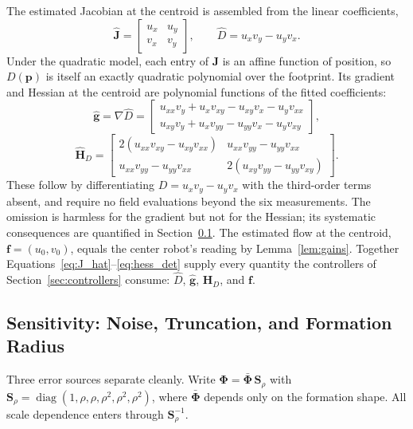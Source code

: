 \documentclass[12pt, letterpaper, oneside]{report}
\begin{document}
The estimated Jacobian at the centroid is assembled from the linear
coefficients,
\begin{equation}
\hat{\mathbf{J}} = \begin{bmatrix} u_x & u_y \\ v_x & v_y \end{bmatrix}, \qquad
\hat D = u_xv_y - u_yv_x.
\label{eq:J_hat}
\end{equation}
Under the quadratic model, each entry of $\mathbf{J}$ is an affine function
of position, so $D(\mathbf{p})$ is itself an exactly quadratic polynomial
over the footprint. Its gradient and Hessian at the centroid are
polynomial functions of the fitted coefficients:
\begin{equation}
\hat{\mathbf{g}} = \nabla\hat D = \begin{bmatrix} u_{xx}v_y + u_xv_{xy} - u_{xy}v_x - u_yv_{xx} \\ u_{xy}v_y + u_xv_{yy} - u_{yy}v_x - u_yv_{xy} \end{bmatrix},
\label{eq:grad_det}
\end{equation}
\begin{equation}
\hat{\mathbf{H}}_D = \begin{bmatrix}
2(u_{xx}v_{xy}-u_{xy}v_{xx}) & u_{xx}v_{yy}-u_{yy}v_{xx} \\
u_{xx}v_{yy}-u_{yy}v_{xx} & 2(u_{xy}v_{yy}-u_{yy}v_{xy})
\end{bmatrix}.
\label{eq:hess_det}
\end{equation}
These follow by differentiating $D=u_xv_y-u_yv_x$ with the third-order
terms absent, and require no field evaluations beyond the six
measurements. The omission is harmless for the gradient but not for the
Hessian; its systematic consequences are quantified in
Section~\ref{sec:sensitivity}. The estimated flow at the centroid,
$\mathbf{f}=(u_0,v_0)$, equals the center robot's reading by
Lemma~\ref{lem:gains}. Together
Equations~\eqref{eq:J_hat}--\eqref{eq:hess_det} supply every quantity the
controllers of Section~\ref{sec:controllers} consume: $\hat D$,
$\hat{\mathbf{g}}$, $\hat{\mathbf{H}}_D$, and $\mathbf{f}$.

\subsection{Sensitivity: Noise, Truncation, and Formation Radius}
\label{sec:sensitivity}

Three error sources separate cleanly. Write
$\boldsymbol{\Phi}=\bar{\boldsymbol{\Phi}}\,\mathbf{S}_\rho$ with
$\mathbf{S}_\rho=\operatorname{diag}(1,\rho,\rho,\rho^2,\rho^2,\rho^2)$,
where $\bar{\boldsymbol{\Phi}}$ depends only on the formation shape. All
scale dependence enters through $\mathbf{S}_\rho^{-1}$.
\end{document}
